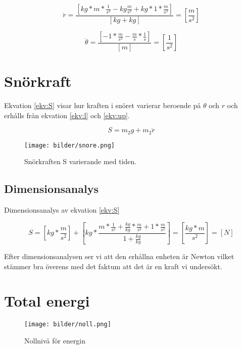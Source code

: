 \documentclass[a4paper,12pt]{article}
\begin{document}
\begin{equation}
\ddot{r} = \frac{[kg*m*\frac{1}{s^2}-kg\frac{m}{s^2} + kg*1*\frac{m}{s^2}]}{[kg+kg]} = [\frac{m}{s^2}]
\label{ekv:ddot_r_dim}
\end{equation}

\begin{equation}
\ddot{\theta} = \frac{[-1*\frac{m}{s^2}-\frac{m}{s}*\frac{1}{s}]}{[m]} = [\frac{1}{s^2}]
\label{ekv:ddot_theta_dim}
\end{equation}


\newpage
\section{Snörkraft}
Ekvation \ref{ekv:S} visar hur kraften i snöret varierar beroende på $\theta$ och $r$ och erhålls från ekvation \ref{ekv:l} och \ref{ekv:up}.

\begin{equation}
S=m_2 g + m_2 \ddot{r}
\label{ekv:S}
\end{equation}

\begin{figure}[!h]
\centering
\texttt{[image: bilder/snore.png]}
\caption{Snörkraften S varierande med tiden.}
\label{fig:snore}
\end{figure}

\subsection*{Dimensionsanalys}
Dimensionsanalys av ekvation \ref{ekv:S}

\begin{equation}
S = [kg*\frac{m}{s^2}] + [kg*\frac{m*\frac{1}{s^2} + \frac{kg}{kg}*\frac{m}{s^2} + 1*\frac{m}{s^2}}{1+\frac{kg}{kg}}] = [\frac{kg*m}{s^2}] = [N]
\label{ekv:S_dim}
\end{equation}

Efter dimensionsanalysen ser vi att den erhållna enheten är Newton vilket stämmer bra överens med det faktum att det är en kraft vi undersökt.


\newpage
\section{Total energi}

\begin{figure}[ht]
\centering
\texttt{[image: bilder/noll.png]}
\caption{Nollnivå för energin}
\label{fig:noll}
\end{figure}
\end{document}
